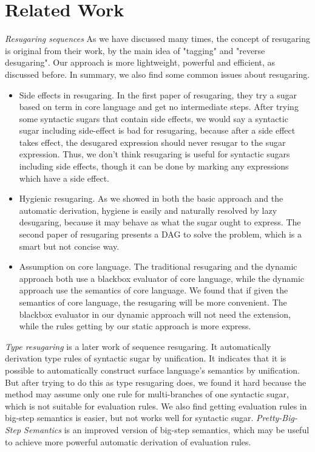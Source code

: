 \section{Related Work}
\label{sec5}

\emph{Resugaring sequences }\cite{resugaring,hygienic} As we have discussed many times, the concept of resugaring is original from their work, by the main idea of "tagging" and "reverse desugaring". Our approach is more lightweight, powerful and efficient, as discussed before. In summary, we also find some common issues about resugaring.
\begin{itemize}
\item Side effects in resugaring.\label{mark:side} In the first paper of resugaring, they try a  sugar based on  term in core language and get no intermediate steps. After trying some syntactic sugars that contain side effects, we would say a syntactic sugar including side-effect is bad for resugaring, because after a side effect takes effect, the desugared expression should never resugar to the sugar expression. Thus, we don't think resugaring is useful for syntactic sugars  including side effects, though it can be done by marking any expressions which have a side effect.
\item Hygienic resugaring. As we showed in both the basic approach and the automatic derivation, hygiene is easily and naturally resolved by lazy desugaring, because it may behave as what the sugar ought to express. The second paper of resugaring presents a DAG to solve the problem, which is a smart but not concise way.
\item Assumption on core language. The traditional resugaring and the dynamic approach both use a blackbox evaluator of core language, while the dynamic approach use the semantics of core language. We found that if given the semantics of core language, the resugaring will be more convenient. The blackbox evaluator in our dynamic approach will not need the extension, while the rules getting by our static approach is more express. 
\end{itemize}

\emph{Type resugaring} \cite{resugaringtype} is a later work of sequence resugaring. It automatically derivation type rules of syntactic sugar by unification. It indicates that it is possible to automatically construct surface language's semantics by unification. But after trying to do this as type resugaring does, we found it hard because the method may assume only one rule for multi-branches of one syntactic sugar, which is not suitable for evaluation rules. We also find getting evaluation rules in big-step semantics is easier, but not works well for syntactic sugar. \emph{Pretty-Big-Step Semantics} \cite{pretty} is an improved version of big-step semantics, which may be useful to achieve more powerful automatic derivation of evaluation rules.




